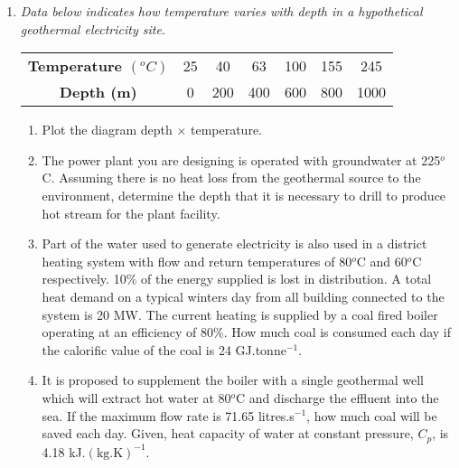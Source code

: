 \documentclass[12pts,a4paper,amsmath,amssymb,floatfix]{article}%
\begin{document}
\begin{enumerate}[label=\bfseries Problem \arabic*]
%

\item\label{EasyQuestion} {\it Data below indicates how temperature varies with depth in a hypothetical geothermal electricity site. 
\begin{center}
\begin{tabular}{||c | c | c | c| c | c| c ||}
\hline\hline
{\bf Temperature $\left(^{o}C\right)$} & 25 & 40 & 63 & 100 & 155 & 245 \\
{\bf Depth (m)}                        & 0 & 200 & 400 & 600 & 800 & 1000 \\
\hline\hline
\end{tabular}
\end{center}
\begin{enumerate}
\item Plot the diagram depth $\times$ temperature. 
\item The power plant you are designing is operated with groundwater at 225$^{o}$C. Assuming there is no heat loss from the geothermal source to the environment, determine the depth that it is necessary to drill to produce hot stream for the plant facility.
\item Part of the water used to generate electricity is also used in a district heating system with flow and return temperatures of 80$^{o}$C and 60$^{o}$C respectively.  10$\%$ of the energy supplied is lost in distribution.  A total heat demand on a typical winters day from all building connected to the system is 20 MW. The current heating is supplied by a coal fired boiler operating at an efficiency of 80$\%$.  How much coal is consumed each day if the calorific value of the coal is 24 GJ.tonne$^{-1}$. 
\item It is proposed to supplement the boiler with a single geothermal well which will extract hot water at 80$^{o}$C and discharge the effluent into the sea.  If the maximum flow rate is 71.65 litres.s$^{-1}$,  how much coal will be saved each day. Given, heat capacity of water at constant pressure, $C_{p}$, is 4.18 kJ.$\left(\text{kg.K}\right)^{-1}$.
\end{enumerate}}

\begin{comment}
Total heat to be supplied (allowing for distribution loss) =   20 / 0.9		=   22.22 MW
Total net energy supplied in day =   22.22 x 10 6 x 24 x 60 x 60   / 1012	              =     1.92 TJ
Coal consumed in a day (allowing for efficiency)  =   1.92 x 1000 / 24 / 0.8         =    100 tonnes
									     =========
Energy supplied by geothermal heat =  flow rate * temperature difference * specific heat of water


\end{comment}
\end{enumerate}
\end{document}
